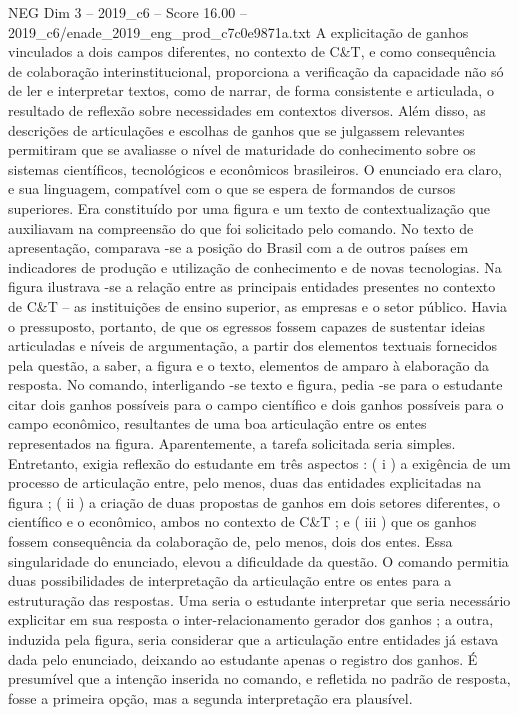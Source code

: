 \begin{textsample}{NEG Dim 3 – 2019\_c6 – Score 16.00 – 2019\_c6/enade\_2019\_eng\_prod\_c7c0e9871a.txt}
A explicitação de ganhos vinculados a dois campos diferentes, no contexto de C\&T, e como consequência de colaboração interinstitucional, proporciona a verificação da capacidade não só de ler e interpretar textos, como de narrar, de forma consistente e articulada, o resultado de reflexão sobre necessidades em contextos diversos.
Além disso, as descrições de articulações e escolhas de ganhos que se julgassem relevantes permitiram que se avaliasse o nível de maturidade do conhecimento sobre os sistemas científicos, tecnológicos e econômicos brasileiros.
O enunciado era claro, e sua linguagem, compatível com o que se espera de formandos de cursos superiores.
Era constituído por uma figura e um texto de contextualização que auxiliavam na compreensão do que foi solicitado pelo comando.
No texto de apresentação, comparava -se a posição do Brasil com a de outros países em indicadores de produção e utilização de conhecimento e de novas tecnologias.
Na figura ilustrava -se a relação entre as principais entidades presentes no contexto de C\&T – as instituições de ensino superior, as empresas e o setor público.
Havia o pressuposto, portanto, de que os egressos fossem capazes de sustentar ideias articuladas e níveis de argumentação, a partir dos elementos textuais fornecidos pela questão, a saber, a figura e o texto, elementos de amparo à elaboração da resposta.
No comando, interligando -se texto e figura, pedia -se para o estudante citar dois ganhos possíveis para o campo científico e dois ganhos possíveis para o campo econômico, resultantes de uma boa articulação entre os entes representados na figura.
Aparentemente, a tarefa solicitada seria simples.
Entretanto, exigia reflexão do estudante em três aspectos : ( i ) a exigência de um processo de articulação entre, pelo menos, duas das entidades explicitadas na figura ; ( ii ) a criação de duas propostas de ganhos em dois setores diferentes, o científico e o econômico, ambos no contexto de C\&T ; e ( iii ) que os ganhos fossem consequência da colaboração de, pelo menos, dois dos entes.
Essa singularidade do enunciado, elevou a dificuldade da questão.
O comando permitia duas possibilidades de interpretação da articulação entre os entes para a estruturação das respostas.
Uma seria o estudante interpretar que seria necessário explicitar em sua resposta o inter-relacionamento gerador dos ganhos ; a outra, induzida pela figura, seria considerar que a articulação entre entidades já estava dada pelo enunciado, deixando ao estudante apenas o registro dos ganhos.
É presumível que a intenção inserida no comando, e refletida no padrão de resposta, fosse a primeira opção, mas a segunda interpretação era plausível.

\end{textsample}
